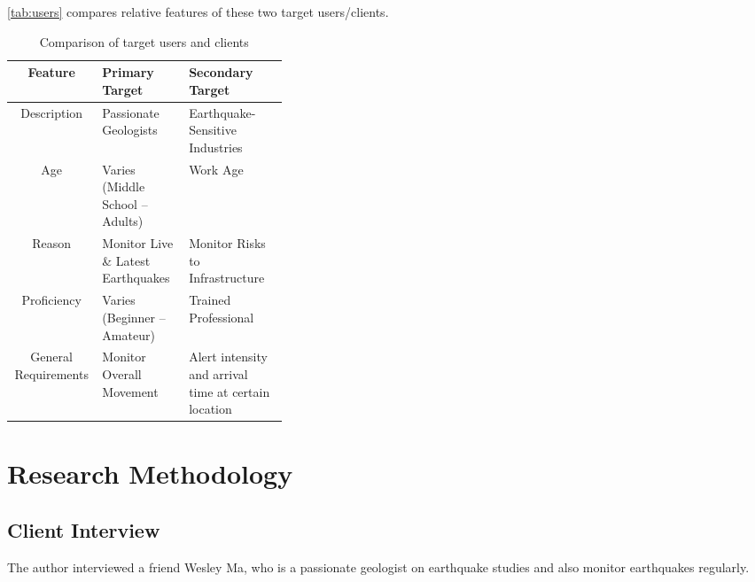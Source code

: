\autoref{tab:users} compares relative features of these two target users/clients.

\begin{table}[htp]
    \centering

    \begin{tabular}{c|l|p{0.36\linewidth}}
        Feature              & Primary Target                     & Secondary Target                                     \\
        \hline
        Description          & Passionate Geologists              & Earthquake-Sensitive Industries                      \\
        Age                  & Varies (Middle School -- Adults)   & Work Age                                             \\
        Reason               & Monitor Live \& Latest Earthquakes & Monitor Risks to Infrastructure                      \\
        Proficiency          & Varies (Beginner -- Amateur)       & Trained Professional                                 \\
        General Requirements & Monitor Overall Movement           & Alert intensity and arrival time at certain location \\
    \end{tabular}

    \caption{Comparison of target users and clients}
    \label{tab:users}
\end{table}

\section{Research Methodology}
\subsection{Client Interview}
The author interviewed a friend Wesley Ma, who is a passionate geologist on earthquake studies and also monitor earthquakes regularly.

